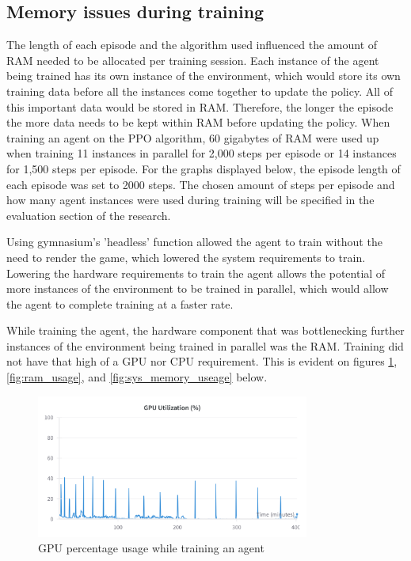 \subsection{Memory issues during training}

The length of each episode and the algorithm used influenced the amount of RAM needed to be allocated per training session. Each instance of the agent being trained has its own instance of the environment, which would store its own training data before all the instances come together to update the policy. All of this important data would be stored in RAM. Therefore, the longer the episode the more data needs to be kept within RAM before updating the policy. When training an agent on the PPO algorithm, 60 gigabytes of RAM were used up when training 11 instances in parallel for 2,000 steps per episode or 14 instances for 1,500 steps per episode. For the graphs displayed below, the episode length of each episode was set to 2000 steps. The chosen amount of steps per episode and how many agent instances were used during training will be specified in the evaluation section of the research. 

Using gymnasium's 'headless' function allowed the agent to train without the need to render the game, which lowered the system requirements to train. Lowering the hardware requirements to train the agent allows the potential of more instances of the environment to be trained in parallel, which would allow the agent to complete training at a faster rate.

While training the agent, the hardware component that was bottlenecking further instances of the environment being trained in parallel was the RAM. Training did not have that high of a GPU nor CPU requirement. This is evident on figures \ref{fig:gpu_memory_usage}, \ref{fig:ram_usage}, and \ref{fig:sys_memory_useage} below. 

\begin{figure}[H]
    \centering
    \includegraphics[width=0.8\textwidth]{figures/GPU_Utilization.png}
    \caption{GPU percentage usage while training an agent}
    \label{fig:gpu_memory_usage}
\end{figure}

